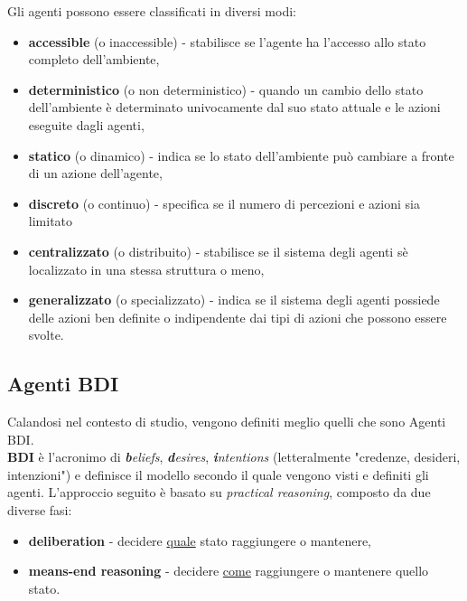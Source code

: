 \documentclass[12pt,a4paper,openright,oneside]{report}
\begin{document}
Gli agenti possono essere classificati in diversi modi:
\begin{itemize}
	\item \textbf{accessible} (o inaccessible) - stabilisce se l'agente ha l'accesso allo stato completo dell'ambiente,
	
	\item \textbf{deterministico} (o non deterministico) - quando un cambio dello stato dell'ambiente è determinato univocamente dal suo stato attuale e le azioni eseguite dagli agenti,
	
	\item \textbf{statico} (o dinamico) - indica se lo stato dell'ambiente può cambiare a fronte di un azione dell'agente,
	
	\item \textbf{discreto} (o continuo) - specifica se il numero di percezioni e azioni sia limitato
	
	\item \textbf{centralizzato} (o distribuito) - stabilisce se il sistema degli agenti sè localizzato in una stessa struttura o meno,
	
	\item \textbf{generalizzato} (o specializzato) - indica se il sistema degli agenti  possiede delle azioni ben definite o indipendente dai tipi di azioni che possono essere svolte.
\end{itemize}


\subsection{Agenti BDI}
Calandosi nel contesto di studio, vengono definiti meglio quelli che sono Agenti BDI.\\

\textbf{BDI} è l'acronimo di \textit{\textbf{b}eliefs}, \textit{\textbf{d}esires}, \textit{\textbf{i}ntentions} (letteralmente "credenze, desideri, intenzioni") e definisce il modello secondo il quale vengono visti e definiti gli agenti. L'approccio seguito è basato su \textit{practical reasoning}, composto da due diverse fasi:

\begin{itemize}
	\item \textbf{deliberation} - decidere \ul{quale} stato raggiungere o mantenere,
	\item \textbf{means-end reasoning} - decidere \ul{come} raggiungere o mantenere quello stato.
\end{itemize}
\end{document}
